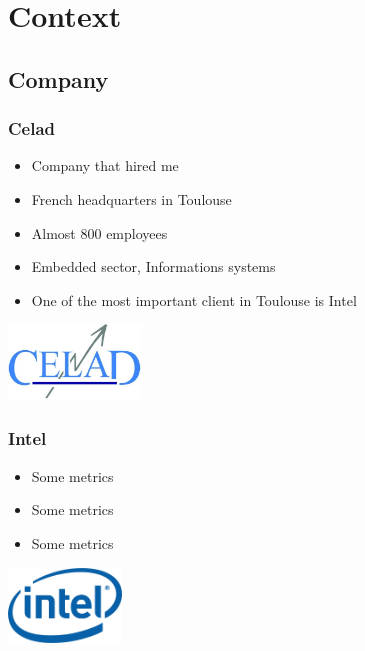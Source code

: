 %
%

\section{Context}

\subsection{Company}
\begin{frame}
    \frametitle{Celad}
    \begin{minipage}{0.49\textwidth}
        \begin{itemize}
            \item Company that hired me
            \item French headquarters in Toulouse
            \item Almost 800 employees
            \item Embedded sector, Informations systems
            \item One of the most important client in Toulouse is Intel
        \end{itemize}
    \end{minipage}
    \begin{minipage}{0.49\textwidth}
        \flushright
        \includegraphics[height=2cm]{../../report/src/img/logocelad.jpg}
    \end{minipage}
\end{frame}

\begin{frame}
    \frametitle{Intel}
    \begin{minipage}{0.49\textwidth}
        \begin{itemize}
            \item Some metrics
            \item Some metrics
            \item Some metrics
        \end{itemize}
    \end{minipage}
    \begin{minipage}{0.49\textwidth}
        \flushright
        \includegraphics[height=2cm]{../../report/src/img/logointel.jpg}
    \end{minipage}
\end{frame}

